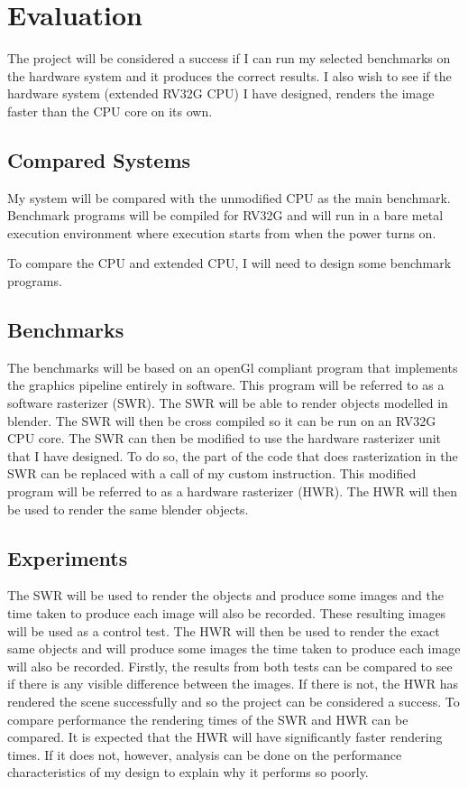 \section{Evaluation}
The project will be considered a success if I can run my selected benchmarks on the hardware system and it produces the correct results. I also wish to see if the hardware system (extended RV32G CPU) I have designed, renders the image faster than the CPU core on its own.
\subsection{Compared Systems}
My system will be compared with the unmodified CPU as the main benchmark. Benchmark programs will be compiled for RV32G and will run in a bare metal execution environment where execution starts from when the power turns on. 

To compare the CPU and extended CPU, I will need to design some benchmark programs. 

\subsection{Benchmarks}
The benchmarks will be based on an openGl compliant program that implements the graphics pipeline entirely in software. 
This program will be referred to as a software rasterizer (SWR). The SWR will be able to render objects modelled in blender. The SWR will then be cross compiled so it can be run on an RV32G CPU core. 
The SWR can then be modified to use the hardware rasterizer unit that I have designed. To do so, the part of the code that does rasterization in the SWR can be replaced with a call of my custom instruction. This modified program will be referred to as a hardware rasterizer (HWR).  The HWR will then be used to render the same blender objects.
\subsection{Experiments}
The SWR will be used to render the objects and produce some images and the time taken to produce each image will also be recorded. These resulting images will be used as a control test.
The HWR will then be used to render the exact same objects and will produce some images the time taken to produce each image will also be recorded. 
Firstly, the results from both tests can be compared to see if there is any visible difference between the images. If there is not, the HWR has rendered the scene successfully and so the project can be considered a success.
To compare performance the rendering times of the SWR and HWR can be compared. It is expected that the HWR will have significantly faster rendering times. If it does not,  however, analysis can be done on the performance characteristics of my design to explain why it performs so poorly.
  

